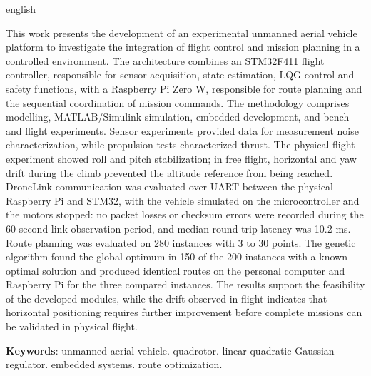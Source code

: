 \begin{resumo}[Abstract]
\begin{otherlanguage*}{english}
\SingleSpacing
{\setlength{\parindent}{1.27cm}\par\noindent\hspace*{\parindent}This work presents the development of an experimental unmanned aerial vehicle platform to investigate the integration of flight control and mission planning in a controlled environment. The architecture combines an STM32F411 flight controller, responsible for sensor acquisition, state estimation, LQG control and safety functions, with a Raspberry Pi Zero W, responsible for route planning and the sequential coordination of mission commands. The methodology comprises modelling, MATLAB/Simulink simulation, embedded development, and bench and flight experiments. Sensor experiments provided data for measurement noise characterization, while propulsion tests characterized thrust. The physical flight experiment showed roll and pitch stabilization; in free flight, horizontal and yaw drift during the climb prevented the altitude reference from being reached. DroneLink communication was evaluated over UART between the physical Raspberry Pi and STM32, with the vehicle simulated on the microcontroller and the motors stopped: no packet losses or checksum errors were recorded during the 60-second link observation period, and median round-trip latency was 10.2 ms. Route planning was evaluated on 280 instances with 3 to 30 points. The genetic algorithm found the global optimum in 150 of the 200 instances with a known optimal solution and produced identical routes on the personal computer and Raspberry Pi for the three compared instances. The results support the feasibility of the developed modules, while the drift observed in flight indicates that horizontal positioning requires further improvement before complete missions can be validated in physical flight.\par}

\noindent\textbf{Keywords}: unmanned aerial vehicle. quadrotor. linear quadratic Gaussian regulator. embedded systems. route optimization.
\end{otherlanguage*}
\end{resumo}
